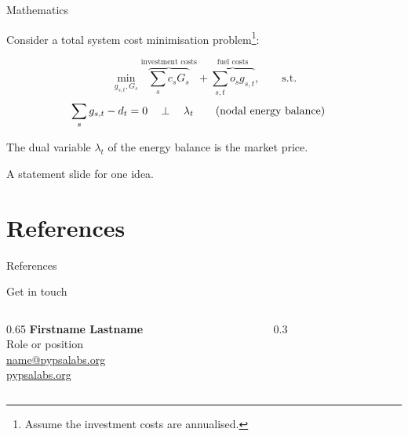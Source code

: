 \documentclass[11pt,aspectratio=169,t]{beamer}
\begin{document}
\begin{frame}{Mathematics}

  Consider a total system cost minimisation problem\footnote{Assume the investment costs are annualised.}:

  \begin{equation*}
    \min_{g_{s,t}, G_s}\overbrace{\sum_s c_s G_s}^{\text{investment costs}} + \overbrace{\sum_{s,t} o_{s} g_{s,t}}^{\text{fuel costs}},   \qquad \text{s.t.}
  \end{equation*}
  \begin{align*}
    \sum_s g_{s,t} - d_t =  0 &\hspace{0.34cm}\perp \hspace{0.34cm} \lambda_t \tag{nodal energy balance}
  \end{align*}

  The dual variable $\lambda_t$ of the energy balance is the \alert{market price}.

\end{frame}

\begin{statement}
  A statement slide for \alert{one} idea.
\end{statement}

\section{References}

\begin{frame}{References}
  \printbibliography[heading=none]
\end{frame}

\begin{frame}{Get in touch}

  \begin{columns}[c]
    \begin{column}{0.65\textwidth}
      \textbf{Firstname Lastname} \\
      Role or position \\[0.6em]
      \href{mailto:name@pypsalabs.org}{name@pypsalabs.org} \\
      \href{https://pypsalabs.org}{pypsalabs.org}
    \end{column}
    \begin{column}{0.3\textwidth}
      \raggedleft{}
    \end{column}
  \end{columns}

\end{frame}
\end{document}

